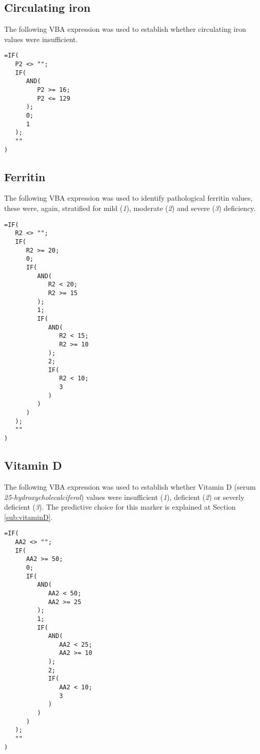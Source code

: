\subsection{Circulating iron}\label{sub:patiron}
The following VBA expression was used to establish whether circulating iron values were insufficient. 

\begin{minipage}{\linewidth}
\begin{lstlisting}
=IF(
   P2 <> "";
   IF(
      AND(
         P2 >= 16;
         P2 <= 129
      );
      0;
      1
   );
   ""
)
\end{lstlisting}
\end{minipage}

\subsection{Ferritin}\label{sub:patferritin}
The following VBA expression was used to identify pathological ferritin values, these were, again, stratified for mild (\textit{1}), moderate (\textit{2}) and severe (\textit{3}) deficiency. 

\begin{lstlisting}
=IF(
   R2 <> "";
   IF(
      R2 >= 20;
      0;
      IF(
         AND(
            R2 < 20;
            R2 >= 15
         );
         1;
         IF(
            AND(
               R2 < 15;
               R2 >= 10
            );
            2;
            IF(
               R2 < 10;
               3
            )
         )
      )
   );
   ""
)
\end{lstlisting}

\subsection{Vitamin D}\label{sub:patvitaminD}
The following VBA expression was used to establish whether Vitamin D (serum \textit{25-hydroxycholecalciferol}) values were insufficient (\textit{1}), deficient (\textit{2}) or severly deficient (\textit{3}). The predictive choice for this marker is explained at Section \ref{sub:vitaminD}.

\begin{lstlisting}
=IF(
   AA2 <> "";
   IF(
      AA2 >= 50;
      0;
      IF(
         AND(
            AA2 < 50;
            AA2 >= 25
         );
         1;
         IF(
            AND(
               AA2 < 25;
               AA2 >= 10
            );
            2;
            IF(
               AA2 < 10;
               3
            )
         )
      )
   );
   ""
)
\end{lstlisting}